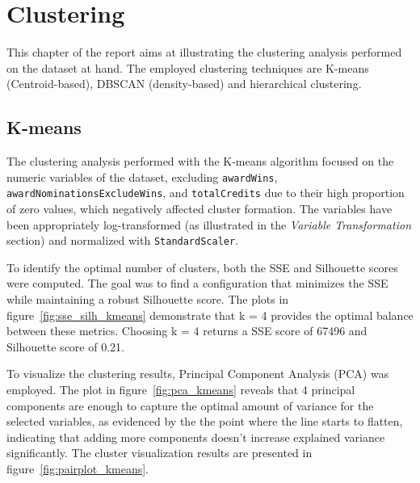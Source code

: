 \chapter{Clustering}
\label{ch:capitolo2}

This chapter of the report aims at illustrating the clustering analysis performed on the dataset at hand.
The employed clustering techniques are K-means (Centroid-based), DBSCAN (density-based) and hierarchical clustering.

\section{K-means}\label{sec:centroid_based} %
The clustering analysis performed with the K-means algorithm focused on the numeric variables of the dataset, excluding \texttt{awardWins}, \texttt{awardNominationsExcludeWins}, and \texttt{totalCredits} due to their high proportion of zero values, which negatively affected cluster formation. 
The variables have been appropriately log-transformed (as illustrated in the \textit{Variable Transformation} section) and normalized with \texttt{StandardScaler}.

To identify the optimal number of clusters, both the SSE and Silhouette scores were computed. The goal was to find a configuration that minimizes the SSE while maintaining a robust Silhouette score. 
The plots in figure~\ref{fig:sse_silh_kmeans} demonstrate that k = 4 provides the optimal balance between these metrics. Choosing k = 4 returns a SSE score of 67496 and Silhouette score of 0.21. 

To visualize the clustering results, Principal Component Analysis (PCA) was employed. The plot in figure~\ref{fig:pca_kmeans} reveals that 4 principal components are enough to capture the optimal amount of variance for the selected variables, as evidenced by the the point where the line starts to flatten, indicating that adding more components doesn't increase explained variance significantly.
The cluster visualization results are presented in figure~\ref{fig:pairplot_kmeans}. 

